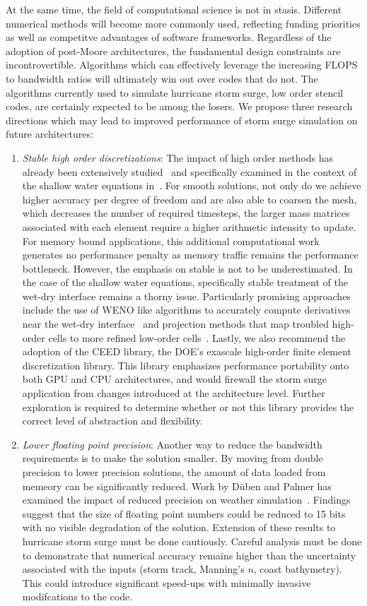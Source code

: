 At the same time, the field of computational science is not in stasis. Different numerical methods will become more commonly used, reflecting funding priorities as well as competitve advantages of software frameworks. Regardless of the adoption of post-Moore architectures, the fundamental design constraints are incontrovertible. Algorithms which can effectively leverage the increasing FLOPS to bandwidth ratios will ultimately win out over codes that do not. The algorithms currently used to simulate hurricane storm surge, low order stencil codes, are certainly expected to be among the losers. We propose three research directions which may lead to improved performance of storm surge simulation on future architectures:
\begin{enumerate}
\item {\em Stable high order discretizations}:
  The impact of high order methods has already been extensively studied~\cite{CEED,Warburton,Gassner,ADERDG, Pazner} and specifically examined in the context of the shallow water equations in~\cite{Brus, Kopera}. For smooth solutions, not only do we achieve higher accuracy per degree of freedom and are also able to coarsen the mesh, which decreases the number of required timesteps, the larger mass matrices associated with each element require a higher arithmetic intensity to update. For memory bound applications, this additional computational work generates no performance penalty as memory traffic remains the performance bottleneck.
  However, the emphasis on stable is not to be underestimated. In the case of the shallow water equations, specifically stable treatment of the wet-dry interface remains a thorny issue. Particularly promising approaches include the use of WENO like algorithms to accurately compute derivatives near the wet-dry interface~\cite{Kopera} and projection methods that map troubled high-order cells to more refined low-order cells~\cite{Rannabauer}. Lastly, we also recommend the adoption of the CEED library, the DOE's exascale high-order finite element discretization library. This library emphasizes performance portability onto both GPU and CPU architectures, and would firewall the storm surge application from changes introduced at the architecture level. Further exploration is required to determine whether or not this library provides the correct level of abstraction and flexibility.
\item {\em Lower floating point precision}: Another way to reduce the bandwidth requirements is to make the solution smaller. By moving from double precision to lower precision solutions, the amount of data loaded from memeory can be significantly reduced. Work by D\"{u}ben and Palmer has examined the impact of reduced precision on weather simulation~\cite{Dueben2014}. Findings suggest that the size of floating point numbers could be reduced to 15 bits with no visible degradation of the solution. Extension of these results to hurricane storm surge must be done cautiously. Careful analysis must be done to demonstrate that numerical accuracy remains higher than the uncertainty associated with the inputs (storm track, Manning's $n$, coast bathymetry). This could introduce significant speed-ups with minimally invasive modifcations to the code.

\end{enumerate}
